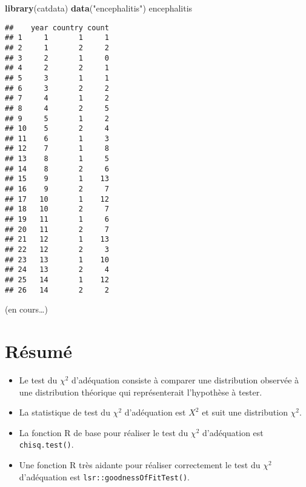 \documentclass[
  french,
]{book}
\newenvironment{Shaded}{\begin{snugshade}}{\end{snugshade}}
\newcommand{\KeywordTok}[1]{\textcolor[rgb]{0.13,0.29,0.53}{\textbf{#1}}}
\newcommand{\NormalTok}[1]{#1}
\newcommand{\StringTok}[1]{\textcolor[rgb]{0.31,0.60,0.02}{#1}}
\providecommand{\tightlist}{%
  \setlength{\itemsep}{0pt}\setlength{\parskip}{0pt}}
\begin{document}
\begin{Shaded}
\begin{Highlighting}[]
\KeywordTok{library}\NormalTok{(catdata)}
\KeywordTok{data}\NormalTok{(}\StringTok{"encephalitis"}\NormalTok{)}
\NormalTok{encephalitis}
\end{Highlighting}
\end{Shaded}

\begin{verbatim}
##    year country count
## 1     1       1     1
## 2     1       2     2
## 3     2       1     0
## 4     2       2     1
## 5     3       1     1
## 6     3       2     2
## 7     4       1     2
## 8     4       2     5
## 9     5       1     2
## 10    5       2     4
## 11    6       1     3
## 12    7       1     8
## 13    8       1     5
## 14    8       2     6
## 15    9       1    13
## 16    9       2     7
## 17   10       1    12
## 18   10       2     7
## 19   11       1     6
## 20   11       2     7
## 21   12       1    13
## 22   12       2     3
## 23   13       1    10
## 24   13       2     4
## 25   14       1    12
## 26   14       2     2
\end{verbatim}

(en cours\ldots)

\hypertarget{ruxe9sumuxe9-4}{%
\section{Résumé}\label{ruxe9sumuxe9-4}}

\begin{itemize}
\tightlist
\item
  Le test du \(\chi^2\) d'adéquation consiste à comparer une distribution observée à une distribution théorique qui représenterait l'hypothèse à tester.
\item
  La statistique de test du \(\chi^2\) d'adéquation est \(X^2\) et suit une distribution \(\chi^2\).
\item
  La fonction R de base pour réaliser le test du \(\chi^2\) d'adéquation est \texttt{chisq.test()}.
\item
  Une fonction R très aidante pour réaliser correctement le test du \(\chi^2\) d'adéquation est \texttt{lsr::goodnessOfFitTest()}.
\end{itemize}

\printbibliography[title=Références, heading=bibintoc]
\end{document}
